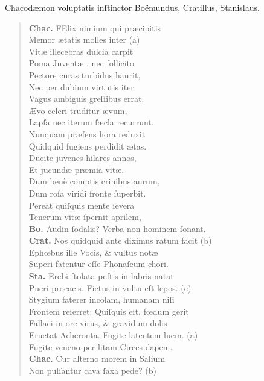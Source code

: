 \documentclass[a4paper,12pt]{article}
\begin{document}
Chacodæmon voluptatis inſtinctor Boëmundus, Cratillus, Stanislaus.
\begin{verse}
\textbf{Chac.}  FElix nimium qui præcipitis\\[0pt]
Memor ætatis molles inter (a)\footnotemark\\[0pt]
Vitæ illecebras dulcia carpit\\[0pt]
Poma Juventæ , nec ſollicito\\[0pt]
Pectore curas turbidus haurit,\\[0pt]
Nec per dubium virtutis iter\\[0pt]
Vagus ambiguis greſſibus errat.\\[0pt]
Ævo celeri truditur ævum,\\[0pt]
Lapſa nec iterum ſæcla recurrunt.\\[0pt]
Nunquam præſens hora reduxit\\[0pt]
Quidquid fugiens perdidit ætas.\\[0pt]
Ducite juvenes hilares annos,\\[0pt]
Et jucundæ præmia vitæ,\\[0pt]
Dum benè comptis crinibus aurum,\\[0pt]
Dum roſa viridi fronte ſuperbit.\\[0pt]
Pereat quiſquis mente ſevera\\[0pt]
Tenerum vitæ ſpernit aprilem,\\[0pt]
\textbf{Bo.} Audin ſodalis? Verba non hominem ſonant.\\[0pt]
\textbf{Crat.} Nos quidquid ante diximus ratum facit (b)\footnotemark\\[0pt]
Ephœbus ille Vocis, \& vultus notæ\\[0pt]
Superi fatentur eſſe Phonaſcum chori.\\[0pt]
\textbf{Sta.} Erebi ſtolata peſtis in labris natat\\[0pt]
Pueri procacis. Fictus in vultu eſt lepos. (c)\footnotemark\\[0pt]
Stygium faterer incolam, humanam niſi\\[0pt]
Frontem reſerret: Quiſquis eſt, fœdum gerit\\[0pt]
Fallaci in ore virus, \& gravidum dolis\\[0pt]
Eructat Acheronta. Fugite latentem luem. (a)\footnotemark\\[0pt]
Fugite veneno per litam Circes dapem.\\[0pt]
\textbf{Chac.} Cur alterno morem in Salium\\[0pt]
Non pulſantur cava ſaxa pede? (b)\footnotemark\\[0pt]

\end{verse}
\end{document}
